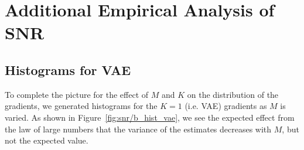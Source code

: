 
\section{Additional Empirical Analysis of SNR}
\label{sec:app:emp}

\subsection{Histograms for VAE}
\label{sec:hist-vae}

To complete the picture for the effect of $M$ and $K$ on the distribution
of the gradients, we generated histograms for the $K=1$ (i.e. \gls{VAE})
gradients as $M$ is varied.  As shown in Figure~\ref{fig:snr/b_hist_vae},
we see the expected effect from the law of large numbers that the 
variance of the estimates decreases with $M$, but not the expected value.


